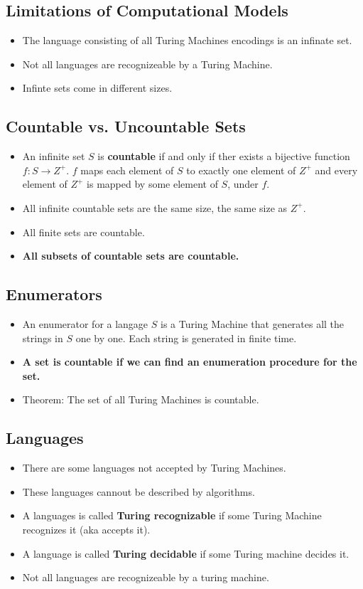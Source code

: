 \documentclass[a4paper]{article}
\begin{document}
\begin{multicols}{2}
\begin{itemize}
	\section{Limitations of Computational Models}
	\begin{itemize}
		\item The language consisting of all Turing Machines encodings is an
					infinate set.
		\item Not all languages are recognizeable by a Turing Machine.
		\item Infinte sets come in different sizes.
	\end{itemize}
	\subsection{Countable vs. Uncountable Sets}
	\begin{itemize}
		\item An infinite set $S$ is \textbf{countable} if and only if ther exists a
					bijective function $f: S \rightarrow Z^+$. $f$ maps each element of
					$S$ to exactly one element of $Z^+$ and every element of $Z^+$ is
					mapped by some element of $S$, under $f$.
		\item All infinite countable sets are the same size, the same size as $Z^+$.
		\item All finite sets are countable.
		\item \textbf{All subsets of countable sets are countable.}
	\end{itemize}
	\subsection{Enumerators}
	\begin{itemize}
		\item An enumerator for a langage $S$ is a Turing Machine that generates
					all the strings in $S$ one by one. Each string is generated in finite
					time.
		\item \textbf{A set is countable if we can find an enumeration procedure for
					the set.}
		\item Theorem: The set of all Turing Machines is countable.
	\end{itemize}
	\subsection{Languages}
	\begin{itemize}
		\item There are some languages not accepted by Turing Machines.
		\item These languages cannout be described by algorithms.
		\item A languages is called \textbf{Turing recognizable} if some Turing
					Machine recognizes it (aka accepts it).
		\item A language is called \textbf{Turing decidable} if some Turing machine
					decides it.
		\item Not all languages are recognizeable by a turing machine.
	\end{itemize}


\end{itemize}
\end{multicols}
\end{document}
